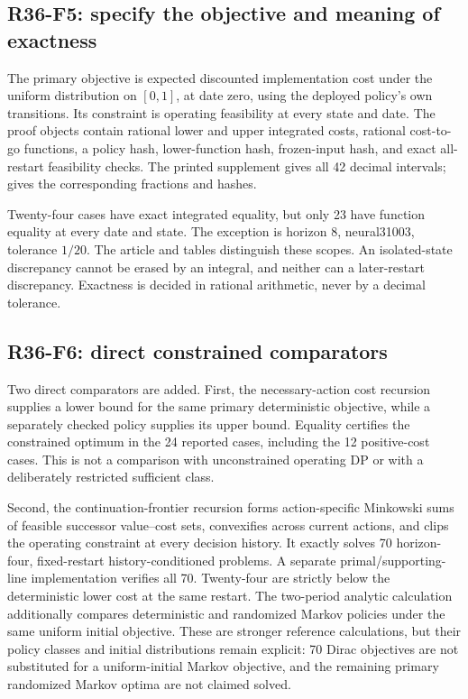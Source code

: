 \subsection{R36-F5: specify the objective and meaning of exactness}
The primary objective is expected discounted implementation cost under the uniform distribution on $[0,1]$, at date zero, using the deployed policy's own transitions. Its constraint is operating feasibility at every state and date. The proof objects contain rational lower and upper integrated costs, rational cost-to-go functions, a policy hash, lower-function hash, frozen-input hash, and exact all-restart feasibility checks. The printed supplement gives all 42 decimal intervals;  gives the corresponding fractions and hashes.

Twenty-four cases have exact integrated equality, but only 23 have function equality at every date and state. The exception is horizon 8, neural31003, tolerance $1/20$. The article and tables distinguish these scopes. An isolated-state discrepancy cannot be erased by an integral, and neither can a later-restart discrepancy. Exactness is decided in rational arithmetic, never by a decimal tolerance.

\subsection{R36-F6: direct constrained comparators}
Two direct comparators are added. First, the necessary-action cost recursion supplies a lower bound for the same primary deterministic objective, while a separately checked policy supplies its upper bound. Equality certifies the constrained optimum in the 24 reported cases, including the 12 positive-cost cases. This is not a comparison with unconstrained operating DP or with a deliberately restricted sufficient class.

Second, the continuation-frontier recursion forms action-specific Minkowski sums of feasible successor value--cost sets, convexifies across current actions, and clips the operating constraint at every decision history. It exactly solves 70 horizon-four, fixed-restart history-conditioned problems. A separate primal/supporting-line implementation verifies all 70. Twenty-four are strictly below the deterministic lower cost at the same restart. The two-period analytic calculation additionally compares deterministic and randomized Markov policies under the same uniform initial objective. These are stronger reference calculations, but their policy classes and initial distributions remain explicit: 70 Dirac objectives are not substituted for a uniform-initial Markov objective, and the remaining primary randomized Markov optima are not claimed solved.

